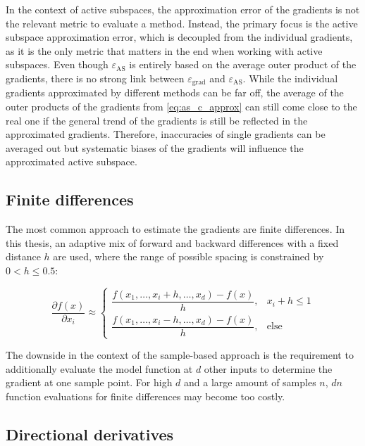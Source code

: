 \documentclass[
  a4paper,  %
  twoside,  %
  bibliography=totoc,
  headsepline,
  cleardoublepage=empty,
  parskip=half,
  draft=false
]{scrbook}
\begin{document}
In the context of active subspaces, the approximation error of the gradients is not the relevant metric to evaluate a method.
Instead, the primary focus is the active subspace approximation error, which is decoupled from the individual gradients, as it is the only metric that matters in the end when working with active subspaces.
Even though $\varepsilon_{\text{AS}}$ is entirely based on the average outer product of the gradients, there is no strong link between $\varepsilon_{\text{grad}}$ and $\varepsilon_{\text{AS}}$.
While the individual gradients approximated by different methods can be far off, the average of the outer products of the gradients from \cref{eq:as_c_approx} can still come close to the real one if the general trend of the gradients is still be reflected in the approximated gradients.
Therefore, inaccuracies of single gradients can be averaged out but systematic biases of the gradients will influence the approximated active subspace.

\subsection{Finite differences}

The most common approach to estimate the gradients are finite differences.
In this thesis, an adaptive mix of forward and backward differences with a fixed distance $h$ are used, where the range of possible spacing is constrained by $0 < h \leq 0.5$:

\begin{equation}
\frac{\partial f(x)}{\partial x_i} \approx
\begin{cases}
    \dfrac{f(x_1, \dots, x_i + h, \dots, x_d) - f(x)}{h}, & x_i + h \leq 1 \\[1.5em]
    \dfrac{f(x_1, \dots, x_i - h, \dots, x_d) - f(x)}{h}, & \text{else}
\end{cases}
\end{equation}

The downside in the context of the sample-based approach is the requirement to additionally evaluate the model function at $d$ other inputs to determine the gradient at one sample point.
For high $d$ and a large amount of samples $n$, $dn$ function evaluations for finite differences may become too costly.

\subsection{Directional derivatives}
\end{document}
